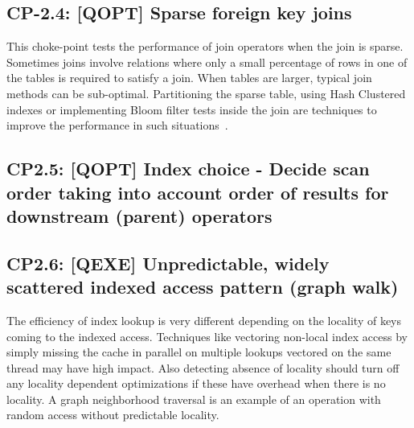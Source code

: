 

\subsection*{CP-2.4: [QOPT] Sparse foreign key joins}
\label{choke_point_2.4}


This choke-point tests the performance of join operators when the join is sparse. Sometimes joins involve relations where only a small percentage of rows in one of the tables is required to satisfy a join. When tables are larger, typical join methods can be sub-optimal. Partitioning the sparse table, using Hash Clustered indexes or implementing Bloom filter tests inside the join are techniques to improve the performance in such situations~\cite{DBLP:journals/csur/Graefe93}.



\subsection*{CP2.5: [QOPT] Index choice - Decide scan order taking into account order of results for downstream (parent) operators}
\label{choke_point_2.5}


%

\subsection*{CP2.6: [QEXE] Unpredictable, widely scattered indexed access pattern (graph walk)}
\label{choke_point_2.6}
The efficiency of index lookup is very different depending on the locality of keys coming to the indexed access. Techniques like vectoring non-local index access by simply missing the cache in parallel on multiple lookups vectored on the same thread may have high impact. Also detecting absence of locality should turn off any locality dependent optimizations if these have overhead when there is no locality. A graph neighborhood traversal is an example of an operation with random access without predictable locality.

%

